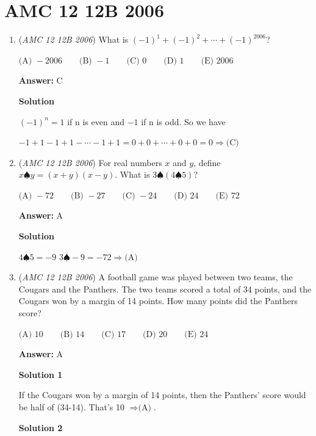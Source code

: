 \section{AMC 12 12B 2006}
        \begin{enumerate}
        	\item (\textit{AMC 12 12B 2006}) What is $( - 1)^1 + ( - 1)^2 + \cdots + ( - 1)^{2006}$?


 $\text {(A) } - 2006 \qquad \text {(B) } - 1 \qquad \text {(C) } 0 \qquad \text {(D) } 1 \qquad \text {(E) } 2006$

 \textbf{Answer: }C



\textbf{Solution}

$(-1)^n=1$ if n is even and $-1$ if n is odd. So we have

 $-1+1-1+1-\cdots-1+1=0+0+\cdots+0+0=0 \Rightarrow \text{(C)}$



	\item (\textit{AMC 12 12B 2006}) For real numbers $x$ and $y$, define $x\spadesuit y = (x + y)(x - y)$.  What is $3\spadesuit(4\spadesuit 5)$?


 $\text {(A) } - 72 \qquad \text {(B) } - 27 \qquad \text {(C) } - 24 \qquad \text {(D) } 24 \qquad \text {(E) } 72$

 \textbf{Answer: }A



\textbf{Solution}

$4\spadesuit 5=-9$
$3\spadesuit -9=-72 \Rightarrow \text{(A)}$



	\item (\textit{AMC 12 12B 2006}) A football game was played between two teams, the Cougars and the Panthers.  The two teams scored a total of 34 points, and the Cougars won by a margin of 14 points.  How many points did the Panthers score?


 $\text {(A) } 10 \qquad \text {(B) } 14 \qquad \text {(C) } 17 \qquad \text {(D) } 20 \qquad \text {(E) } 24$

 \textbf{Answer: }A



\textbf{Solution 1}

If the Cougars won by a margin of 14 points, then the Panthers' score would be half of (34-14). That's 10 $\Rightarrow \boxed{\text{(A)}}$.

 



\textbf{Solution 2}


\end{enumerate}
